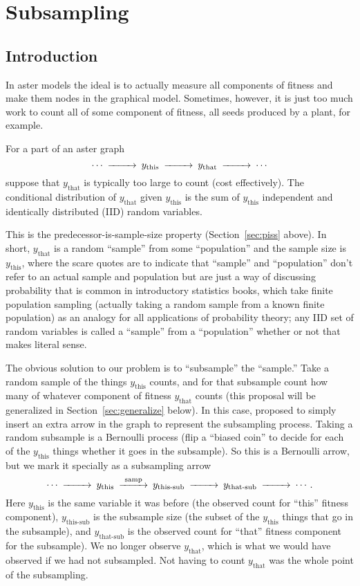 
\chapter{Subsampling} \label{chap:subsampling}

\section{Introduction}

In aster models the ideal is to actually measure
all components of fitness and make them nodes in the graphical model.
Sometimes, however, it is just too much work to count all of some component
of fitness, all seeds produced by a plant, for example.

For a part of an aster graph
$$
\begin{CD}
   \cdots @>>> y_\text{this} @>>> y_\text{that} @>>> \cdots
\end{CD}
$$
suppose that $y_\text{that}$ is typically too large to count (cost effectively).
The conditional distribution of $y_\text{that}$ given $y_\text{this}$ is
the sum of $y_\text{this}$
independent and identically distributed (IID) random variables.

This is the predecessor-is-sample-size property
(Section~\ref{sec:piss} above).
In short, $y_\text{that}$ is a random ``sample''
from some ``population'' and the sample size is $y_\text{this}$, where the scare
quotes are to indicate that ``sample'' and ``population'' don't refer
to an actual sample and population but are just a way of discussing
probability that is common in introductory statistics books, which
take finite population sampling (actually taking a random sample from
a known finite population) as an analogy for all applications of probability
theory; any IID set of random variables is called a ``sample'' from
a ``population'' whether or not that makes literal sense.

The obvious solution to our problem is to ``subsample'' the ``sample.''
Take a random sample of the things $y_\text{this}$ counts,
and for that subsample count how many of whatever component
of fitness $y_\text{that}$ counts (this proposal will be generalized
in Section~\ref{sec:generalize} below).  In this case,
\citet[p.~E43]{aster2} proposed to simply insert an extra arrow in the
graph to represent the subsampling process.
Taking a random subsample is a Bernoulli process (flip a ``biased coin''
to decide for each of the $y_\text{this}$ things whether it goes in the
subsample).
So this is a Bernoulli arrow, but we mark it specially as a subsampling arrow
$$
\begin{CD}
   \cdots @>>> y_\text{this} @>\text{samp}>> y_\text{this-sub}
   @>>> y_\text{that-sub} @>>> \cdots .
\end{CD}
$$
Here $y_\text{this}$ is the same variable it was before (the observed count for
``this'' fitness component), $y_\text{this-sub}$ is the subsample size
(the subset of the $y_\text{this}$ things that go in the subsample),
and $y_\text{that-sub}$ is the observed count for ``that'' fitness component
for the subsample).  We no longer observe $y_\text{that}$, which
is what we would have observed if we had not subsampled.  Not having to
count $y_\text{that}$ was the whole point of the subsampling.

